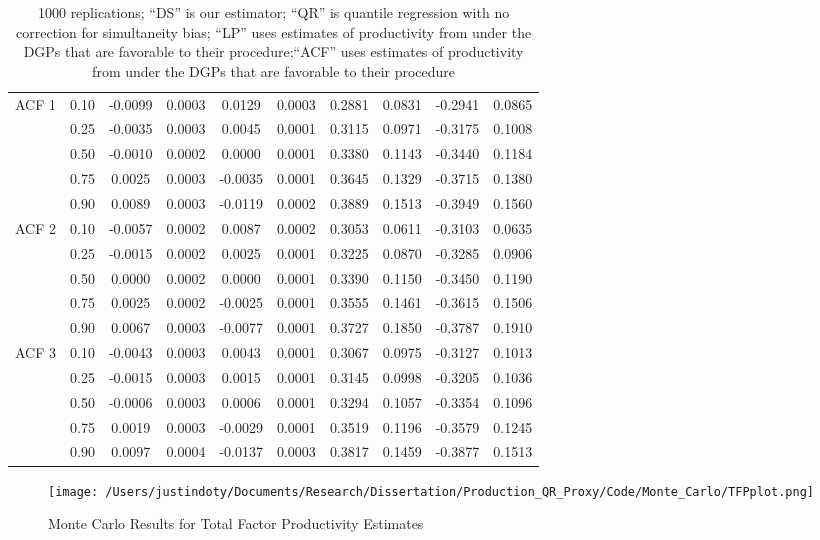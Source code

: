\documentclass[11pt]{article}
\begin{document}
\begin{table}[H]
\begin{tabular}{cccccccccc}
   \hline
ACF 1 & 0.10 & -0.0099 & 0.0003 & 0.0129 & 0.0003 & 0.2881 & 0.0831 & -0.2941 & 0.0865 \\ 
   & 0.25 & -0.0035 & 0.0003 & 0.0045 & 0.0001 & 0.3115 & 0.0971 & -0.3175 & 0.1008 \\ 
   & 0.50 & -0.0010 & 0.0002 & 0.0000 & 0.0001 & 0.3380 & 0.1143 & -0.3440 & 0.1184 \\ 
   & 0.75 & 0.0025 & 0.0003 & -0.0035 & 0.0001 & 0.3645 & 0.1329 & -0.3715 & 0.1380 \\ 
   & 0.90 & 0.0089 & 0.0003 & -0.0119 & 0.0002 & 0.3889 & 0.1513 & -0.3949 & 0.1560 \\ 
  ACF 2 & 0.10 & -0.0057 & 0.0002 & 0.0087 & 0.0002 & 0.3053 & 0.0611 & -0.3103 & 0.0635 \\ 
   & 0.25 & -0.0015 & 0.0002 & 0.0025 & 0.0001 & 0.3225 & 0.0870 & -0.3285 & 0.0906 \\ 
   & 0.50 & 0.0000 & 0.0002 & 0.0000 & 0.0001 & 0.3390 & 0.1150 & -0.3450 & 0.1190 \\ 
   & 0.75 & 0.0025 & 0.0002 & -0.0025 & 0.0001 & 0.3555 & 0.1461 & -0.3615 & 0.1506 \\ 
   & 0.90 & 0.0067 & 0.0003 & -0.0077 & 0.0001 & 0.3727 & 0.1850 & -0.3787 & 0.1910 \\ 
  ACF 3 & 0.10 & -0.0043 & 0.0003 & 0.0043 & 0.0001 & 0.3067 & 0.0975 & -0.3127 & 0.1013 \\ 
   & 0.25 & -0.0015 & 0.0003 & 0.0015 & 0.0001 & 0.3145 & 0.0998 & -0.3205 & 0.1036 \\ 
   & 0.50 & -0.0006 & 0.0003 & 0.0006 & 0.0001 & 0.3294 & 0.1057 & -0.3354 & 0.1096 \\ 
   & 0.75 & 0.0019 & 0.0003 & -0.0029 & 0.0001 & 0.3519 & 0.1196 & -0.3579 & 0.1245 \\ 
   & 0.90 & 0.0097 & 0.0004 & -0.0137 & 0.0003 & 0.3817 & 0.1459 & -0.3877 & 0.1513 \\ 
   \hline
\end{tabular}
\caption*{1000 replications; ``DS'' is our estimator; ``QR'' is quantile regression with no correction for simultaneity bias; ``LP'' uses estimates of productivity from \cite{Levinsohn2003} under the DGPs that are favorable to their procedure;``ACF'' uses estimates of productivity from \cite{Ackerberg2015} under the DGPs that are favorable to their procedure}
\label{simresults}
\end{table}
\pagebreak
\newpage

\begin{figure}[H]
\centering
\caption{Monte Carlo Results for Total Factor Productivity Estimates}
\texttt{[image: /Users/justindoty/Documents/Research/Dissertation/Production\_QR\_Proxy/Code/Monte\_Carlo/TFPplot.png]}
\label{fig:MCTFP}
\end{figure}
\end{document}

